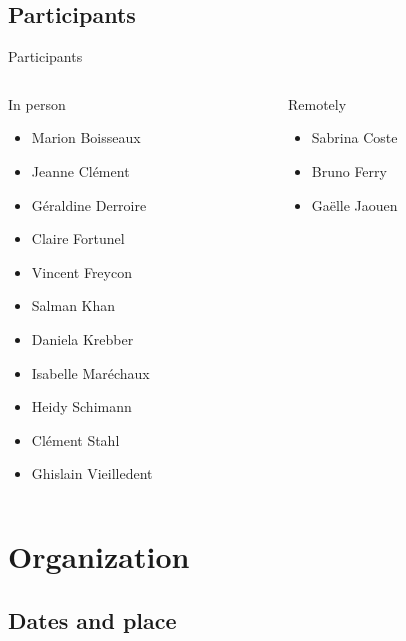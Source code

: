 \documentclass[10pt,table,dvipsnames,compress]{beamer}
\begin{document}
\subsection{Participants}
\label{sec:org2175d28}

\begin{frame}[label={sec:org7d9040a}]{Participants}
\begin{columns}
\begin{column}{0.5\columnwidth}
\begin{block}{In person}
\begin{itemize}
\item Marion Boisseaux
\item Jeanne Clément
\item Géraldine Derroire
\item Claire Fortunel
\item Vincent Freycon
\item Salman Khan
\item Daniela Krebber
\item Isabelle Maréchaux
\item Heidy Schimann
\item Clément Stahl
\item Ghislain Vieilledent
\end{itemize}
\end{block}
\end{column}

\begin{column}{0.5\columnwidth}
\begin{block}{Remotely}
\begin{itemize}
\item Sabrina Coste
\item Bruno Ferry
\item Gaëlle Jaouen
\end{itemize}
\end{block}
\end{column}
\end{columns}
\end{frame}

\section{Organization}
\label{sec:org5d1adb7}

\subsection{Dates and place}
\label{sec:org8124640}
\end{document}
